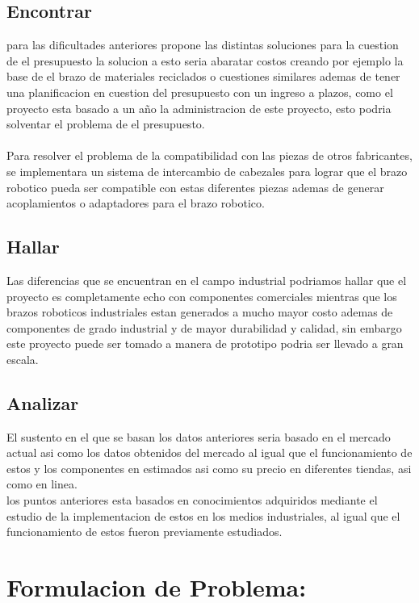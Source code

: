 \documentclass[14pt,a4paper]{article}
\begin{document}
\subsection{Encontrar}
para las dificultades anteriores propone las distintas soluciones para la cuestion de el presupuesto la solucion a esto seria abaratar costos creando por ejemplo la base de el brazo de materiales reciclados o cuestiones similares ademas de tener una planificacion en cuestion del presupuesto con un ingreso a plazos, como el proyecto esta basado a un año la administracion de este proyecto, esto podria solventar el problema de el presupuesto.\\
\\Para resolver el problema de la compatibilidad con las piezas de otros fabricantes, se implementara un sistema de intercambio de cabezales para lograr que el brazo robotico pueda ser compatible con estas diferentes piezas ademas de generar acoplamientos o adaptadores para el brazo robotico. 

\subsection{Hallar}
Las diferencias que se encuentran en el campo industrial podriamos hallar 
que el proyecto es completamente echo con componentes comerciales mientras que los brazos roboticos industriales estan generados a mucho mayor costo ademas de componentes de grado industrial y de mayor durabilidad y calidad, sin embargo este proyecto puede ser tomado a manera de prototipo podria ser llevado a gran escala.  

\subsection{Analizar} 
El sustento en el que se basan los datos anteriores seria basado en el mercado actual asi como los datos obtenidos del mercado al igual que el funcionamiento de estos y los componentes en estimados asi como su precio en diferentes tiendas, asi como en linea.\\
los puntos anteriores esta basados en conocimientos adquiridos mediante el estudio de la implementacion de estos en los medios industriales, al igual que el funcionamiento de estos fueron previamente estudiados.

\section{Formulacion de Problema:}
\end{document}
